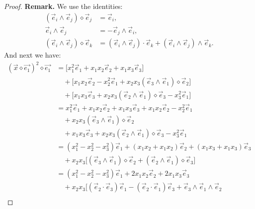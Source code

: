 \documentclass{amsart}
\theoremstyle{plain}
\numberwithin{equation}{section}
\begin{document}
\begin{proof}
\textbf{Remark.} We use the identities:
\begin{align*}
\left( \vec{e}_{i} \wedge \vec{e}_{j} \right) \diamond \vec{e}_{j}
&= \vec{e}_{i}, \\[4pt]
\vec{e}_{i} \wedge \vec{e}_{j}
&= - \vec{e}_{j} \wedge \vec{e}_{i}, \\[4pt]
\left( \vec{e}_{i} \wedge \vec{e}_{j} \right) \diamond \vec{e}_{k}
&= \left( \vec{e}_{i} \wedge \vec{e}_{j} \right) \cdot \vec{e}_{k}
+ \left( \vec{e}_{i} \wedge \vec{e}_{j} \right) \wedge \vec{e}_{k}.
\end{align*}
And next we have:
\begin{align*}
(\vec{x}\diamond\vec{e_1})^2\diamond \vec{e_1}&= \Big[
x_{1}^{2}\vec{e}_{1}
+ x_{1}x_{2}\vec{e}_{2}
+ x_{1}x_{3}\vec{e}_{3}
\Big] \\[4pt]
&\quad + \Big[
x_{1}x_{2}\vec{e}_{2}
- x_{2}^{2}\vec{e}_{1}
+ x_{2}x_{3}\left( \vec{e}_{3}\wedge \vec{e}_{1} \right)\diamond \vec{e}_{2}
\Big] \\[4pt]
&\quad + \Big[
x_{1}x_{3}\vec{e}_{3}
+ x_{2}x_{3}\left( \vec{e}_{2}\wedge \vec{e}_{1} \right)\diamond \vec{e}_{3}
- x_{3}^{2}\vec{e}_{1}
\Big] \\[8pt]
&= x_{1}^{2}\vec{e}_{1}
+ x_{1}x_{2}\vec{e}_{2}
+ x_{1}x_{3}\vec{e}_{3}
+ x_{1}x_{2}\vec{e}_{2}
- x_{2}^{2}\vec{e}_{1} \\[4pt]
&\quad + x_{2}x_{3}\left( \vec{e}_{3}\wedge \vec{e}_{1} \right)\diamond \vec{e}_{2} \\[4pt]
&\quad + x_{1}x_{3}\vec{e}_{3}
+ x_{2}x_{3}\left( \vec{e}_{2}\wedge \vec{e}_{1} \right)\diamond \vec{e}_{3}
- x_{3}^{2}\vec{e}_{1} \\[4pt]
&= \left( x_{1}^{2}-x_{2}^{2}-x_{3}^{2} \right)\vec{e}_{1}
+ \left( x_{1}x_{2}+x_{1}x_{2} \right)\vec{e}_{2}
+ \left( x_{1}x_{3}+x_{1}x_{3} \right)\vec{e}_{3} \\[4pt]
&\quad + x_{2}x_{3}
\Big[
\left( \vec{e}_{3}\wedge \vec{e}_{1} \right)\diamond \vec{e}_{2}
+ \left( \vec{e}_{2}\wedge \vec{e}_{1} \right)\diamond \vec{e}_{3}
\Big] \\[8pt]
&= \left( x_{1}^{2}-x_{2}^{2}-x_{3}^{2} \right)\vec{e}_{1}
+ 2x_{1}x_{2}\vec{e}_{2}
+ 2x_{1}x_{3}\vec{e}_{3} \\[6pt]
&\quad + x_{2}x_{3}
\Big[
\left( \vec{e}_{2}\cdot \vec{e}_{3} \right)\vec{e}_{1}
- \left( \vec{e}_{2}\cdot \vec{e}_{1} \right)\vec{e}_{3}
+ \vec{e}_{3}\wedge \vec{e}_{1}\wedge \vec{e}_{2} \\[4pt]

\end{align*}
\end{proof}
\end{document}
